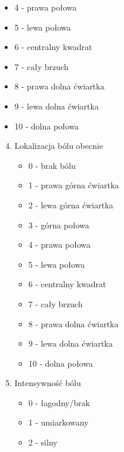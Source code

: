\documentclass{report}
\begin{document}
\begin{itemize}
\begin{enumerate}
\begin{itemize}
                \item 4 - prawa połowa
                \item 5 - lewa połowa
                \item 6 - centralny kwadrat
                \item 7 - cały brzuch
                \item 8 - prawa dolna ćwiartka
                \item 9 - lewa dolna ćwiartka
                \item 10 - dolna połowa
            \end{itemize}
        \end{enumerate}
        \begin{enumerate}
            \setcounter{enumi}{3}
            \item Lokalizacja bólu obecnie
            \begin{itemize}
                \item 0 - brak bólu
                \item 1 - prawa górna ćwiartka
                \item 2 - lewa górna ćwiartka
                \item 3 - górna połowa
                \item 4 - prawa połowa
                \item 5 - lewa połowa
                \item 6 - centralny kwadrat
                \item 7 - cały brzuch
                \item 8 - prawa dolna ćwiartka
                \item 9 - lewa dolna ćwiartka
                \item 10 - dolna połowa
            \end{itemize}
        \end{enumerate}
        \begin{enumerate}
            \setcounter{enumi}{4}
            \item Intensywność bólu
            \begin{itemize}
                \item 0 - łagodny/brak
                \item 1 - umiarkowany
                \item 2 - silny
            \end{itemize}
        \end{enumerate}
        \begin{enumerate}

\end{enumerate}
\end{itemize}
\end{document}
